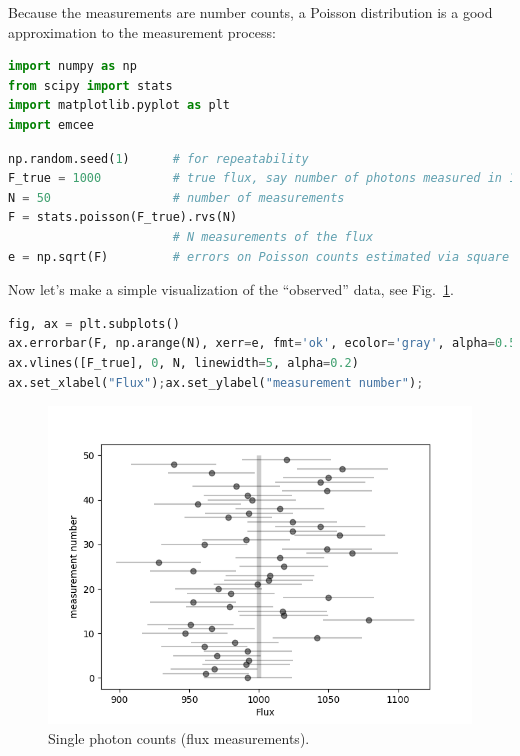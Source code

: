 \documentclass[%
oneside,                 %
final,                   %
10pt]{article}
\begin{document}
Because the measurements are number counts, a Poisson distribution is a good approximation to the measurement process:

\begin{lstlisting}[language=Python,style=blue1]
import numpy as np
from scipy import stats
import matplotlib.pyplot as plt
import emcee
\end{lstlisting}

\begin{lstlisting}[language=Python,style=blue1]
np.random.seed(1)      # for repeatability
F_true = 1000          # true flux, say number of photons measured in 1 second
N = 50                 # number of measurements
F = stats.poisson(F_true).rvs(N)
                       # N measurements of the flux
e = np.sqrt(F)         # errors on Poisson counts estimated via square root
\end{lstlisting}

Now let's make a simple visualization of the ``observed'' data, see Fig.~\ref{fig:flux}.

\begin{lstlisting}[language=Python,style=blue1]
fig, ax = plt.subplots()
ax.errorbar(F, np.arange(N), xerr=e, fmt='ok', ecolor='gray', alpha=0.5)
ax.vlines([F_true], 0, N, linewidth=5, alpha=0.2)
ax.set_xlabel("Flux");ax.set_ylabel("measurement number");
\end{lstlisting}


\begin{figure}[!ht]  %
  \centerline{\includegraphics[width=0.8\linewidth]{fig/singlephotoncount_fig_1.png}}
  \caption{
  Single photon counts (flux measurements). \label{fig:flux}
  }
\end{figure}
\end{document}
